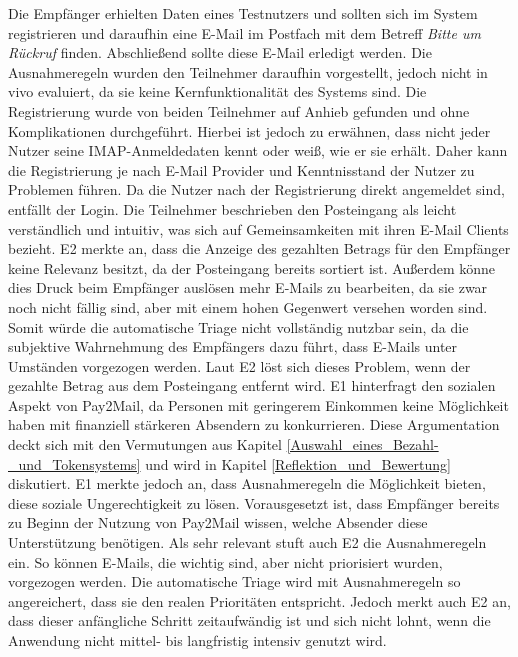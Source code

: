 Die Empfänger erhielten Daten eines Testnutzers und sollten sich im System registrieren und daraufhin eine E-Mail im Postfach mit dem Betreff \textit{Bitte um Rückruf} finden. Abschließend sollte diese E-Mail erledigt werden. Die Ausnahmeregeln wurden den Teilnehmer daraufhin vorgestellt, jedoch nicht in vivo evaluiert, da sie keine Kernfunktionalität des Systems sind. Die Registrierung wurde von beiden Teilnehmer auf Anhieb gefunden und ohne Komplikationen durchgeführt. Hierbei ist jedoch zu erwähnen, dass nicht jeder Nutzer seine IMAP-Anmeldedaten kennt oder weiß, wie er sie erhält. Daher kann die Registrierung je nach E-Mail Provider und Kenntnisstand der Nutzer zu Problemen führen. Da die Nutzer nach der Registrierung direkt angemeldet sind, entfällt der Login. Die Teilnehmer beschrieben den Posteingang als leicht verständlich und intuitiv, was sich auf Gemeinsamkeiten mit ihren E-Mail Clients bezieht. E2 merkte an, dass die Anzeige des gezahlten Betrags für den Empfänger keine Relevanz besitzt, da der Posteingang bereits sortiert ist. Außerdem könne dies Druck beim Empfänger auslösen mehr E-Mails zu bearbeiten, da sie zwar noch nicht fällig sind, aber mit einem hohen Gegenwert versehen worden sind. Somit würde die automatische Triage nicht vollständig nutzbar sein, da die subjektive Wahrnehmung des Empfängers dazu führt, dass E-Mails unter Umständen vorgezogen werden. Laut E2 löst sich dieses Problem, wenn der gezahlte Betrag aus dem Posteingang entfernt wird. E1 hinterfragt den sozialen Aspekt von Pay2Mail, da Personen mit geringerem Einkommen keine Möglichkeit haben mit finanziell stärkeren Absendern zu konkurrieren. Diese Argumentation deckt sich mit den Vermutungen aus Kapitel \ref{Auswahl_eines_Bezahl-_und_Tokensystems} und wird in Kapitel \ref{Reflektion_und_Bewertung} diskutiert. E1 merkte jedoch an, dass Ausnahmeregeln die Möglichkeit bieten, diese soziale Ungerechtigkeit zu lösen. Vorausgesetzt ist, dass Empfänger bereits zu Beginn der Nutzung von Pay2Mail wissen, welche Absender diese Unterstützung benötigen. Als sehr relevant stuft auch E2 die Ausnahmeregeln ein. So können E-Mails, die wichtig sind, aber nicht priorisiert wurden, vorgezogen werden. Die automatische Triage wird mit Ausnahmeregeln so angereichert, dass sie den realen Prioritäten entspricht. Jedoch merkt auch E2 an, dass dieser anfängliche Schritt zeitaufwändig ist und sich nicht lohnt, wenn die Anwendung nicht mittel- bis langfristig intensiv genutzt wird.  


